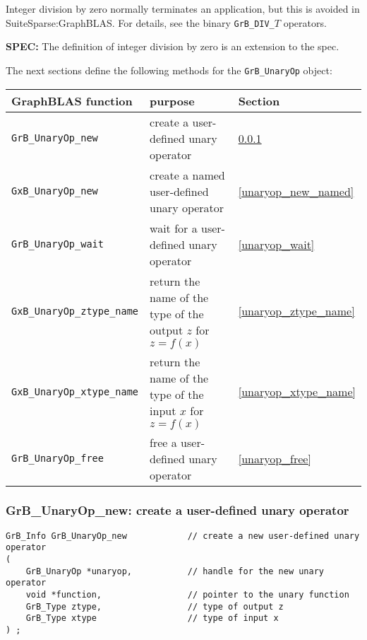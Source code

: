 \documentclass[12pt]{article}
\begin{document}
Integer division by zero normally terminates an application, but this is
avoided in SuiteSparse:GraphBLAS.  For details, see the binary
\verb'GrB_DIV_'$T$ operators.

\begin{alert}
{\bf SPEC:} The definition of integer division by zero is an extension to the spec.
\end{alert}

The next sections define the following methods for the \verb'GrB_UnaryOp'
object:

\vspace{0.1in}
{\footnotesize
\begin{tabular}{lll}
GraphBLAS function   & purpose                                      & Section \\
\hline
\verb'GrB_UnaryOp_new'   & create a user-defined unary operator         & \ref{unaryop_new} \\
\verb'GxB_UnaryOp_new'   & create a named user-defined unary operator   & \ref{unaryop_new_named} \\
\verb'GrB_UnaryOp_wait'  & wait for a user-defined unary operator       & \ref{unaryop_wait} \\
\verb'GxB_UnaryOp_ztype_name' & return the name of the type of the output $z$ for $z=f(x)$   & \ref{unaryop_ztype_name} \\
\verb'GxB_UnaryOp_xtype_name' & return the name of the type of the input $x$ for $z=f(x)$    & \ref{unaryop_xtype_name} \\
\verb'GrB_UnaryOp_free'  & free a user-defined unary operator   & \ref{unaryop_free} \\
\hline
\end{tabular}
}
\vspace{0.1in}

\newpage
\subsubsection{{\sf GrB\_UnaryOp\_new:} create a user-defined unary operator}
\label{unaryop_new}

\begin{mdframed}[userdefinedwidth=6in]
{\footnotesize
\begin{verbatim}
GrB_Info GrB_UnaryOp_new            // create a new user-defined unary operator
(
    GrB_UnaryOp *unaryop,           // handle for the new unary operator
    void *function,                 // pointer to the unary function
    GrB_Type ztype,                 // type of output z
    GrB_Type xtype                  // type of input x
) ;
\end{verbatim} }\end{mdframed}
\end{document}
